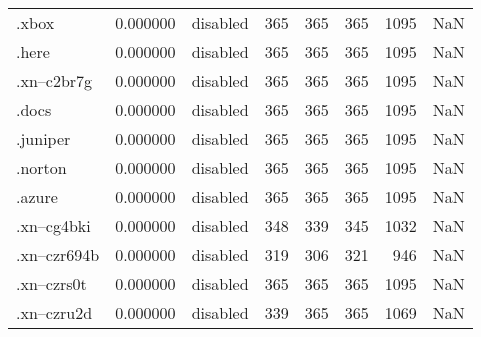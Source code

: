 \begin{tabular}{lrlrrrrl}
.xbox                     &          0.000000 &        disabled &                         365 &                         365 &                         365 &                1095 &                  NaN \\
.here                     &          0.000000 &        disabled &                         365 &                         365 &                         365 &                1095 &                  NaN \\
.xn--c2br7g               &          0.000000 &        disabled &                         365 &                         365 &                         365 &                1095 &                  NaN \\
.docs                     &          0.000000 &        disabled &                         365 &                         365 &                         365 &                1095 &                  NaN \\
.juniper                  &          0.000000 &        disabled &                         365 &                         365 &                         365 &                1095 &                  NaN \\
.norton                   &          0.000000 &        disabled &                         365 &                         365 &                         365 &                1095 &                  NaN \\
.azure                    &          0.000000 &        disabled &                         365 &                         365 &                         365 &                1095 &                  NaN \\
.xn--cg4bki               &          0.000000 &        disabled &                         348 &                         339 &                         345 &                1032 &                  NaN \\
.xn--czr694b              &          0.000000 &        disabled &                         319 &                         306 &                         321 &                 946 &                  NaN \\
.xn--czrs0t               &          0.000000 &        disabled &                         365 &                         365 &                         365 &                1095 &                  NaN \\
.xn--czru2d               &          0.000000 &        disabled &                         339 &                         365 &                         365 &                1069 &                  NaN \\

\end{tabular}

